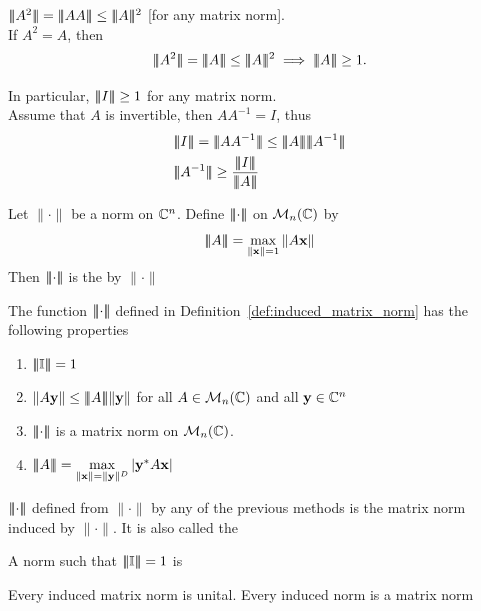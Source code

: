 \documentclass[aspectratio=169]{beamer}
\begin{document}
\begin{frame}

\begin{remark}
 $\tripbar A^2 \tripbar = \tripbar A A\tripbar\leq \tripbar A \tripbar^2 $ [for any matrix norm].\\
 
If $A^2= A$, then 
 \[\tripbar A^2 \tripbar = \tripbar A \tripbar\leq \tripbar A\tripbar^2 \implies \tripbar A \tripbar \geq 1.\]
 
 In particular, $|\! |\! | I |\! |\! | \geq 1$ for any matrix norm. \\
 
 Assume that $A$ is invertible, then $AA^{-1}=I$, thus 
 \begin{align}
     &\tripbar I \tripbar = \tripbar AA^{-1} \tripbar \leq \tripbar A \tripbar \tripbar A^{-1}\tripbar\\
     &\tripbar A^{-1} \tripbar\geq \dfrac{\tripbar I \tripbar }{\tripbar A\tripbar}
 \end{align}
\end{remark}
\end{frame}




\begin{frame}
\begin{definition}\label{def:induced_matrix_norm}
Let $\|\cdot\|$ be a norm on $\mathbb{C}^n$. Define $\left|\!\left|\!\left|\cdot\right|\!\right|\!\right|$ on $\mathcal{M}_n(\mathbb{C})$ by 
\[
    |\! |\! | A|\! |\! |  = \max\limits_{\|\mathbf{x}\|=1} \|A\mathbf{x}\|
\]
Then $\left|\!\left|\!\left|\cdot\right|\!\right|\!\right|$ is the  by $\|\cdot\|$
\end{definition}
\vfill
\begin{theorem}
The function $\left|\!\left|\!\left|\cdot\right|\!\right|\!\right|$ defined in Definition~\ref{def:induced_matrix_norm} has the following properties
\begin{enumerate}
    \item $|\! |\! |\mathbb{I}|\! |\! | =1$
    \item $\| A\mathbf{y} \| \leq |\! |\! | A |\! |\! | \|\mathbf{y}\|$ for all $A\in \mathcal{M}_n(\mathbb{C})$ and all $\mathbf{y} \in \mathbb{C}^n$
    \item $\left|\!\left|\!\left|\cdot\right|\!\right|\!\right|$ is a matrix norm on $\mathcal{M}_n(\mathbb{C})$.
    \item $|\! |\! | A |\! |\! | = \max\limits_{\|\mathbf{x}\|= \|\mathbf{y}\|^D} |\mathbf{y}^* A\mathbf{x}|$
\end{enumerate}
\end{theorem}
\end{frame}


\begin{frame}
\begin{definition}
$\left|\!\left|\!\left|\cdot\right|\!\right|\!\right|$ defined from $\|\cdot\|$ by any of the previous methods is the matrix norm induced by $\|\cdot\|$. It is also called the 
\end{definition}
\vfill
\begin{definition}
A norm such that $|\! |\! | \mathbb{I} |\! |\! |=1$ is 
\end{definition}
\vfill
\begin{remark}
 Every induced matrix norm is unital. Every induced norm is a matrix norm
\end{remark}
\end{frame}
\end{document}
